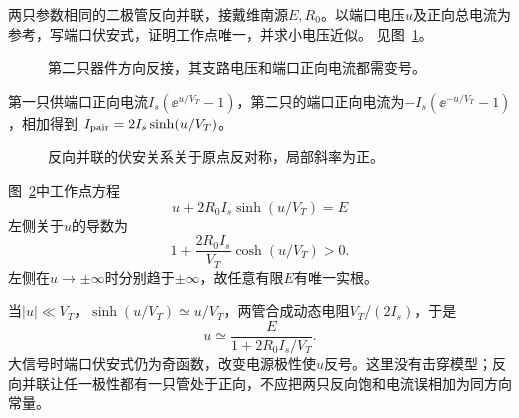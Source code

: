 \begin{example}[反向并联的两只二极管]\label{ex:c4-antiparallel}
两只参数相同的二极管反向并联，接戴维南源$E,R_0$。以端口电压$u$及正向总电流为参考，写端口伏安式，证明工作点唯一，并求小电压近似。 见图~\ref{fig:c4-antiparallel-q}。
\end{example}

\begin{figure}[H]\centering
{}
\caption{第二只器件方向反接，其支路电压和端口正向电流都需变号。}\label{fig:c4-antiparallel-q}
\end{figure}
\begin{solution}
第一只供端口正向电流$I_s(\ee^{u/V_T}-1)$，第二只的端口正向电流为$-I_s(\ee^{-u/V_T}-1)$，相加得到
$I_{\rm pair}=2I_s\sinh(u/V_T)$。

\begin{figure}[H]\centering
{}
\caption{反向并联的伏安关系关于原点反对称，局部斜率为正。}\label{fig:c4-antiparallel-s}
\end{figure}

图~\ref{fig:c4-antiparallel-s}中工作点方程
\[
 u+2R_0I_s\sinh(u/V_T)=E
\]
左侧关于$u$的导数为
\[
 1+\frac{2R_0I_s}{V_T}\cosh(u/V_T)>0.
\]
左侧在$u\to\pm\infty$时分别趋于$\pm\infty$，故任意有限$E$有唯一实根。

当$|u|\ll V_T$，$\sinh(u/V_T)\simeq u/V_T$，两管合成动态电阻$V_T/(2I_s)$，于是
\[
 \boxed{u\simeq\frac{E}{1+2R_0I_s/V_T}}.
\]
大信号时端口伏安式仍为奇函数，改变电源极性使$u$反号。这里没有击穿模型；反向并联让任一极性都有一只管处于正向，不应把两只反向饱和电流误相加为同方向常量。
\end{solution}





